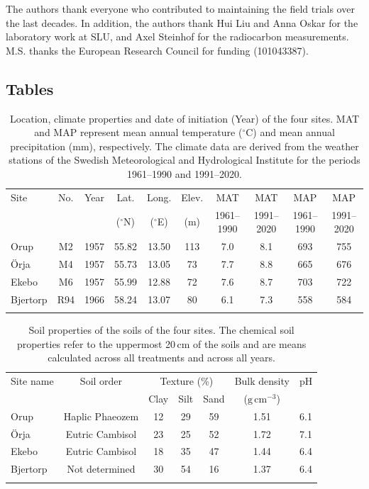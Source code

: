 \documentclass[bg, manuscript]{copernicus}
\begin{document}
\begin{acknowledgements}
The authors thank everyone who contributed to maintaining the field trials over the last decades. In addition, the authors thank Hui Liu and Anna Oskar for the laboratory work at SLU, and Axel Steinhof for the radiocarbon measurements. M.S. thanks the European Research Council for funding (101043387).
\end{acknowledgements}

\clearpage

\subsection{Tables}
\clearpage

  
\begin{table}[t]
\caption{Location, climate properties and date of initiation (Year) of the four sites. MAT and MAP represent mean annual temperature ($^\circ$C) and mean annual precipitation (mm), respectively. The climate data are derived from the weather stations of the Swedish Meteorological and Hydrological Institute for the periods 1961--1990 and 1991--2020.}
\label{table:site}
\begin{tabular}{lccccccccc}
\tophline
Site & No. & Year & Lat. & Long. & Elev. & MAT & MAT & MAP & MAP \\
 & & & ($^\circ$N) & ($^\circ$E) & (m) & 1961--1990 & 1991--2020 & 1961--1990 & 1991--2020 \\
\middlehline
Orup & M2 & 1957 & 55.82 & 13.50 & 113 & 7.0 & 8.1 & 693 & 755 \\
Örja & M4 & 1957 & 55.73 & 13.05 & 73 & 7.7 & 8.8 & 665 & 676 \\
Ekebo & M6 & 1957 & 55.99 & 12.88 & 72 & 7.6 & 8.7 & 703 & 722 \\
Bjertorp & R94 & 1966 & 58.24 & 13.07 & 80 & 6.1 & 7.3 & 558 & 584 \\
\bottomhline
\end{tabular}
\belowtable{}
\end{table}

\clearpage

\begin{table}[t]
\caption{Soil properties of the soils of the four sites. The chemical soil properties refer to the uppermost 20\,cm of the soils and are means calculated across all treatments and across all years.}
\label{table:soilproperties}
\begin{tabular}{lcccccc}
\tophline
Site name & Soil order & \multicolumn{3}{c}{Texture (\%)} & Bulk density & pH \\
 & & Clay & Silt & Sand & ($\text{g}\,\text{cm}^{-3}$) & \\
\middlehline
Orup & Haplic Phaeozem & 12 & 29 & 59 & 1.51 & 6.1 \\
Örja & Eutric Cambisol & 23 & 25 & 52 & 1.72 & 7.1 \\
Ekebo & Eutric Cambisol & 18 & 35 & 47 & 1.44 & 6.4 \\
Bjertorp & Not determined & 30 & 54 & 16 & 1.37 & 6.4 \\
\bottomhline
\end{tabular}
\end{table}
\clearpage
\end{document}
